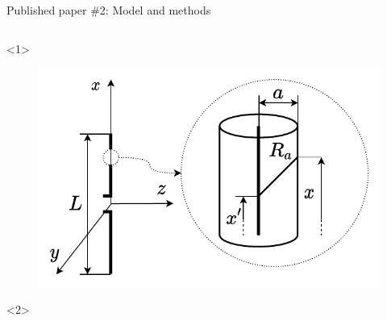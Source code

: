 \documentclass[xcolor=dvipsnames,10pt]{beamer}
\begin{document}
\begin{frame}{Published paper \#2: Model and methods}
    \begin{columns}[c]
        \begin{column}{0.4\textwidth}
            \begin{onlyenv}<1>
                \begin{center}
                \begin{figure}
                    \includegraphics[width=\textwidth]{artwork/IEEE-TEMC-dipole.pdf}
                \end{figure}
                \end{center}
            \end{onlyenv}
            \begin{onlyenv}<2>
                \begin{center}
                \begin{figure}

\end{figure}
\end{center}
\end{onlyenv}
\end{column}
\end{columns}
\end{frame}
\end{document}
